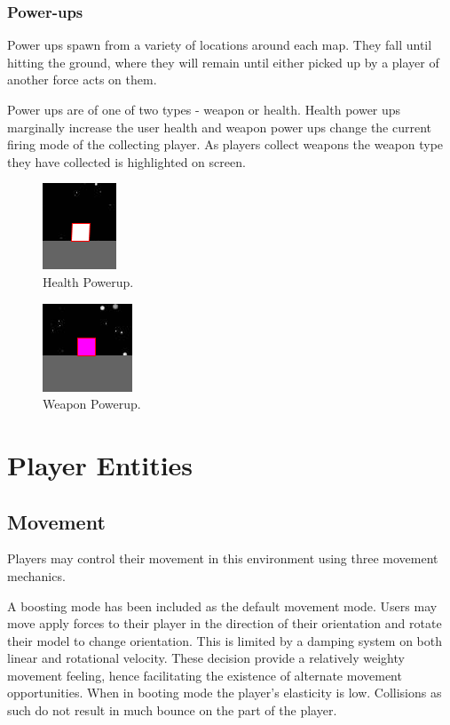 \documentclass[10pt,a4paper]{article}
\begin{document}
\subsubsection{Power-ups}

Power ups spawn from a variety of locations around each map. They fall until hitting the ground, where they will remain until either picked up by a player of another force acts on them.

Power ups are of one of two types - weapon or health. Health power ups marginally increase the user health and weapon power ups change the current firing mode of the collecting player. As players collect weapons the weapon type they have collected is highlighted on screen.

\begin{figure}[!h]
\centering
  \includegraphics{health_powerup.png}
  \caption{Health Powerup.}
  \label{fig:boat1}
\end{figure}

\begin{figure}[!h]
\centering
  \includegraphics{weapon_powerup.png}
  \caption{Weapon Powerup.}
  \label{fig:boat1}
\end{figure}

\section{Player Entities}

\subsection{Movement}

Players may control their movement in this environment using three movement mechanics. 

A boosting mode has been included as the default movement mode. Users may move apply forces to their player in the direction of their orientation and rotate their model to change orientation. This is limited by a damping system on both linear and rotational velocity. These decision provide a relatively weighty movement feeling, hence facilitating the existence of alternate movement opportunities. When in booting mode the player's elasticity is low. Collisions as such do not result in much bounce on the part of the player.
\end{document}
